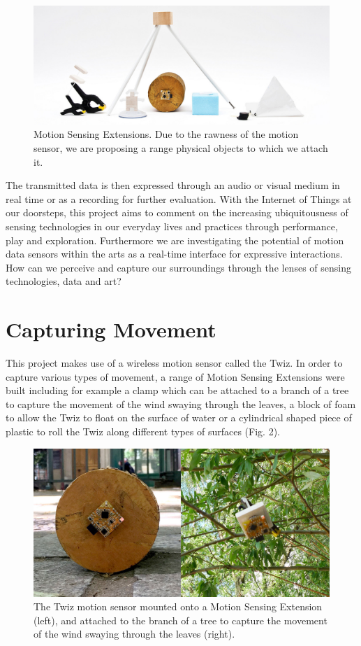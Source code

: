 \documentclass{sigchi}
\begin{document}
\begin{figure}[H]
\centering
\includegraphics[width=\columnwidth]{pics/extensions}
\caption{Motion Sensing Extensions. Due to the rawness of the motion sensor,
we are proposing a range  physical objects to which we attach it.}
\label{fig:extensions}
\end{figure}

The transmitted data is
then expressed through an audio or visual medium in
real time or as a recording for further evaluation. With
the Internet of Things at our doorsteps, this project
aims to comment on the increasing ubiquitousness of
sensing technologies in our everyday lives and practices
through performance, play and exploration.
Furthermore we are investigating the potential of
motion data sensors within the arts as a real-time
interface for expressive interactions. How can we
perceive and capture our surroundings through the
lenses of sensing technologies, data and art?

\section{Capturing Movement}

This project makes use of a wireless motion sensor
called the Twiz\cite{twiz}. In order to capture various types of
movement, a range of Motion Sensing Extensions were
built including for example a clamp which can be
attached to a branch of a tree to capture the movement
of the wind swaying through the leaves, a block of
foam to allow the Twiz to float on the surface of water
or a cylindrical shaped piece of plastic to roll the Twiz
along different types of surfaces (Fig. 2).

\begin{figure}[H]
\centering
\includegraphics[width=\columnwidth]{pics/fieldtrip}
\caption{The Twiz motion sensor mounted onto a Motion
Sensing Extension (left), and attached to the branch of
a tree to capture the movement of the wind swaying through
the leaves (right).}
\label{fig:fieldtrip}
\end{figure}
\end{document}
